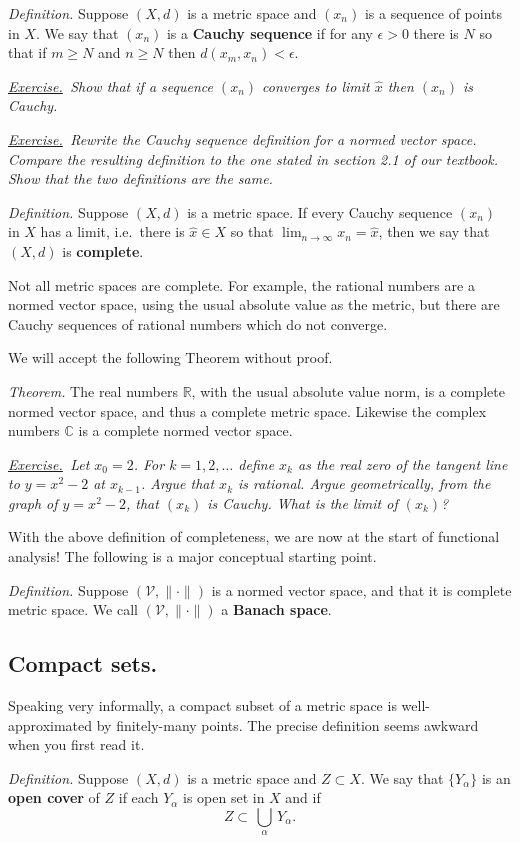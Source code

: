 \documentclass[12pt]{article}
\newcommand{\cV}{\mathcal{V}}
\newcommand{\CC}{\mathbb{C}}
\newcommand{\RR}{\mathbb{R}}
\newcommand{\eps}{\epsilon}
\newcommand{\sect}[1]{\subsection*{#1.}}
\newcommand{\defin}{\emph{Definition.}\,\,}
\newcommand{\thm}{\emph{Theorem.}\,\,}
\newcommand{\exer}[2]{\emph{\underline{Exercise.}\, #2} \vspace*{#1mm}}
\begin{document}
\defin Suppose $(X,d)$ is a metric space and $(x_n)$ is a sequence of points in $X$.  We say that $(x_n)$ is a \textbf{Cauchy sequence} if for any $\eps>0$ there is $N$ so that if $m \ge N$ and $n\ge N$ then $d(x_m,x_n)<\eps$.

\exer{35}{Show that if a sequence $(x_n)$ converges to limit $\hat x$ then $(x_n)$ is Cauchy.}

\clearpage\newpage
\exer{50}{Rewrite the Cauchy sequence definition for a normed vector space.  Compare the resulting definition to the one stated in section 2.1 of our textbook.  Show that the two definitions are the same.}

\defin Suppose $(X,d)$ is a metric space.  If every Cauchy sequence $(x_n)$ in $X$ has a limit, i.e.~there is $\hat x\in X$ so that $\displaystyle \lim_{n\to\infty} x_n=\hat x$, then we say that $(X,d)$ is \textbf{complete}.

Not all metric spaces are complete.  For example, the rational numbers are a normed vector space, using the usual absolute value as the metric, but there are Cauchy sequences of rational numbers which do not converge.

We will accept the following Theorem without proof.

\thm The real numbers $\RR$, with the usual absolute value norm, is a complete normed vector space, and thus a complete metric space.  Likewise the complex numbers $\CC$ is a complete normed vector space.

\exer{60}{Let $x_0=2$.  For $k=1,2,\dots$ define $x_k$ as the real zero of the tangent line to $y=x^2-2$ at $x_{k-1}$.  Argue that $x_k$ is rational.  Argue geometrically, from the graph of $y=x^2-2$, that $(x_k)$ is Cauchy.  What is the limit of $(x_k)$?}

With the above definition of completeness, we are now at the start of functional analysis!  The following is a major conceptual starting point.

\defin Suppose $(\cV,\|\cdot\|)$ is a normed vector space, and that it is complete metric space.  We call $(\cV,\|\cdot\|)$ a \textbf{Banach space}.


\clearpage\newpage
\sect{Compact sets}

Speaking very informally, a compact subset of a metric space is well-approximated by finitely-many points.  The precise definition seems awkward when you first read it.

\defin Suppose $(X,d)$ is a metric space and $Z \subset X$.  We say that $\{Y_\alpha\}$ is an \textbf{open cover} of $Z$ if each $Y_\alpha$ is open set in $X$ and if
	$$Z \subset \,\bigcup_{\alpha} \,Y_\alpha.$$
\end{document}
